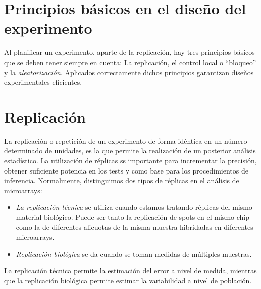  \section{Principios b\'asicos en el dise\~no del experimento}
 Al planificar un experimento, aparte de la replicaci\'on, hay tres principios b\'asicos que se deben tener siempre en cuenta: 
La replicaci\'on, el control local o ``bloqueo'' y la \textit{aleatorizaci\'on}.
Aplicados correctamente dichos principios garantizan dise\~nos experimentales eficientes.


\section{Replicaci\'on\label{replicacion}}

La replicaci\'on o repetici\'on de un experimento de forma id\'entica en un n\'umero determinado de unidades, es la que
permite la realizaci\'on de un posterior an\'alisis estad\'istico.
La utilizaci\'on de r\'eplicas ss importante para incrementar la precisi\'on, obtener suficiente potencia en los tests y como base para los
procedimientos de inferencia. Normalmente, distinguimos dos tipos de r\'eplicas en el an\'alisis de microarrays:

\begin{itemize}
\item \emph{La replicaci\'on t\'ecnica} se utiliza cuando estamos tratando
r\'eplicas del mismo material biol\'ogico. Puede ser tanto la replicaci\'on
de spots en el mismo chip como la de diferentes alicuotas de la misma muestra
hibridadas en diferentes microarrays.

\item \emph{Replicaci\'on biol\'ogica} se da cuando se toman medidas de m\'ultiples
muestras.

\end{itemize}
La replicaci\'on t\'ecnica permite la estimaci\'on del error a nivel de medida, mientras que
la  replicaci\'on biol\'ogica permite estimar la variabilidad a nivel de poblaci\'on.



\vspace{-0.5cm}
\begin{figure}[!h]
\label{c04replicas}
\end{figure}


